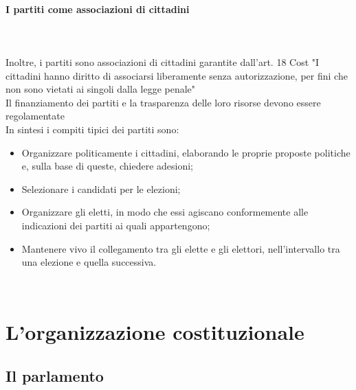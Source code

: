 \documentclass{report}
\begin{document}
\subsubsection{I partiti come associazioni di cittadini}
\\
\\ 
Inoltre, i partiti sono associazioni di cittadini garantite dall'art. 18 Cost "I cittadini hanno diritto di associarsi liberamente senza autorizzazione, per fini che non sono vietati ai singoli dalla legge penale"
\\
Il finanziamento dei partiti e la trasparenza delle loro risorse devono essere regolamentate
\\
In sintesi i compiti tipici dei partiti sono:
\\
\begin{itemize}
  \item Organizzare politicamente i cittadini, elaborando le proprie proposte politiche e, sulla base di queste, chiedere adesioni;
  \item Selezionare i candidati per le elezioni;
  \item Organizzare gli eletti, in modo che essi agiscano conformemente alle indicazioni dei partiti ai quali appartengono;
  \item Mantenere vivo il collegamento tra gli elette e gli elettori, nell'intervallo tra una elezione e quella successiva.
\end{itemize}
\\
\chapter{L'organizzazione costituzionale} %
\label{chap:L'organizzazione costituzionale}
\section{Il parlamento}
\\
\end{document}

